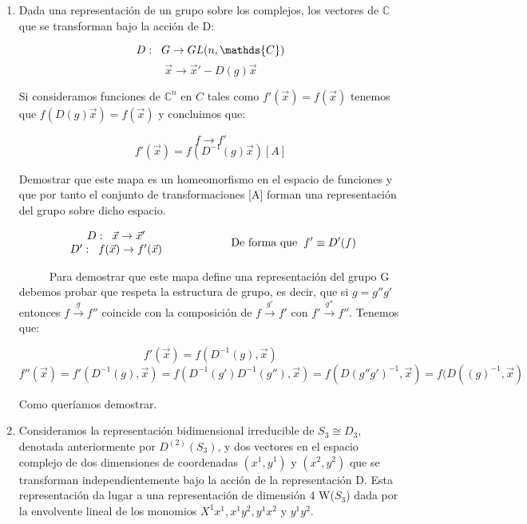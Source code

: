 \begin{enumerate}
\item Dada una representación de un grupo sobre los complejos, los vectores de $\mathds{C}$ que se transforman bajo la acción de D:

$$D: \hspace{0.2cm} G \to GL(n,\mathds{C})$$
$$\Vec{x}\to \Vec{x}'-D(g)\Vec{x}$$

Si consideramos funciones de $\mathds{C}^n$ en $C$ tales como $f'(\Vec{x})=f(\Vec{x})$ tenemos que $f(D(g)\Vec{x})=f(\Vec{x})$ y concluimos que:

$$f\longrightarrow f'$$
$$f'(\Vec{x})=f(D^{-1}(g)\Vec{x})[A]$$

Demostrar que este mapa es un homeomorfismo en el espacio de funciones y que por tanto el conjunto de transformaciones [A] forman una representación del grupo sobre dicho espacio.

$$\begin{array}{cc}
D: \hspace{0.2cm} \Vec{x}\to \Vec{x}'  \\
D': \hspace{0.2cm} f(\Vec{x})\to f'(\Vec{x})
\end{array} \hspace{2cm} \text{De forma que} \hspace{0.2cm} f'\equiv D'(f)$$

\smallskip
$\hspace{1cm}$ Para demostrar que este mapa define una representación del grupo G debemos probar que respeta la estructura de grupo, es decir, que si $g=g''g'$ entonces $f\overset{g}{\longrightarrow} f''$ coincide con la composición de $f \overset{g'}{\longrightarrow} f'$ con $f'\overset{g''}{\longrightarrow}f''$. Tenemos que:

$$f'(\Vec{x})=f(D^{-1}(g),\Vec{x})$$
$$f''(\Vec{x})=f'(D^{-1}(g), \Vec{x})=f(D^{-1}(g')D^{-1}(g''),\Vec{x
})=f(D(g''g')^{-1},\Vec{x})=f(D((g)^{-1},\Vec{x})$$

Como queríamos demostrar.

\item Consideramos la representación bidimensional irreducible de $S_3 \cong D_3$, denotada anteriormente por $D^{(2)}(S_3)$, y dos vectores en el espacio complejo de dos dimensiones de coordenadas $(x^1,y^1)$ y $(x^2,y^2)$ que se transforman independientemente bajo la acción de la representación D. Esta representación da lugar a una representación de dimensión 4 W($S_3$) dada por la envolvente lineal de los monomios $X^1x^1, x^1y^2,y^1x^2$ y $y^1y^2$.


\end{enumerate}
